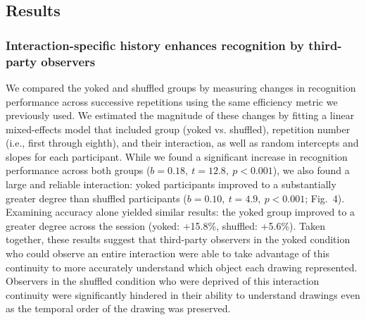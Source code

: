 \documentclass[10pt,letterpaper]{article}
\newcommand{\ndg}[1]{{\textcolor{Green}{[ndg: #1]}}}
\begin{document}
\subsection{Results}

\subsubsection{Interaction-specific history enhances recognition by third-party observers}



We compared the yoked and shuffled groups by measuring changes in recognition performance across successive repetitions using the same efficiency metric we previously used.
We estimated the magnitude of these changes by fitting a linear mixed-effects model that included group (yoked vs. shuffled), repetition number (i.e., first through eighth), and their interaction, as well as random intercepts and slopes for each participant.
While we found a significant increase in recognition performance across both groups ($b = 0.18, ~t = 12.8, ~p < 0.001$), %
we also found a large and reliable interaction:
yoked participants improved to a substantially greater degree than shuffled participants ($b = 0.10, ~t = 4.9, ~p<0.001$; Fig.~4).
Examining accuracy alone yielded similar results: the yoked group improved to a greater degree across the session (yoked: +15.8\%, shuffled: +5.6\%).
Taken together, these results suggest that third-party observers in the yoked condition who could observe an entire interaction were able to take advantage of this continuity to more accurately understand which object each drawing represented.
Observers in the shuffled condition who were deprived of this interaction continuity were significantly hindered in their ability to understand drawings even as the temporal order of the drawing was preserved.
\end{document}
